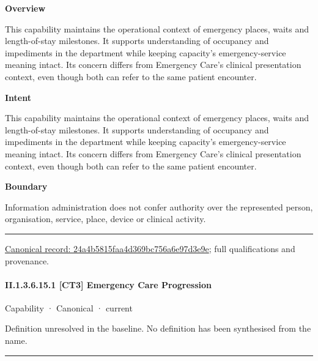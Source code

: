 \textbf{Overview}



This capability maintains the operational context of emergency places, waits and length-of-stay milestones. It supports understanding of occupancy and impediments in the department while keeping capacity's emergency-service meaning intact. Its concern differs from Emergency Care's clinical presentation context, even though both can refer to the same patient encounter.



\textbf{Intent}



This capability maintains the operational context of emergency places, waits and length-of-stay milestones. It supports understanding of occupancy and impediments in the department while keeping capacity's emergency-service meaning intact. Its concern differs from Emergency Care's clinical presentation context, even though both can refer to the same patient encounter.



\textbf{Boundary}



Information administration does not confer authority over the represented person, organisation, service, place, device or clinical activity.



\medskip\hrule\medskip

{\footnotesize \href{../../../../../../../continuum/strategy/capability/24a4b5815faa4d369bc756a6e97d3e9e.md}{Canonical record: 24a4b5815faa4d369bc756a6e97d3e9e}; full qualifications and provenance.}\par
\paragraph*{II.1.3.6.15.1 [CT3] Emergency Care Progression}
\label{navigation:II.1.3.6.15.1}

\label{element:7125e459a48946d0ba075b5ecc3571b4}
{\small Capability · Canonical · current}\par

Definition unresolved in the baseline. No definition has been synthesised from the name.



\medskip\hrule\medskip

